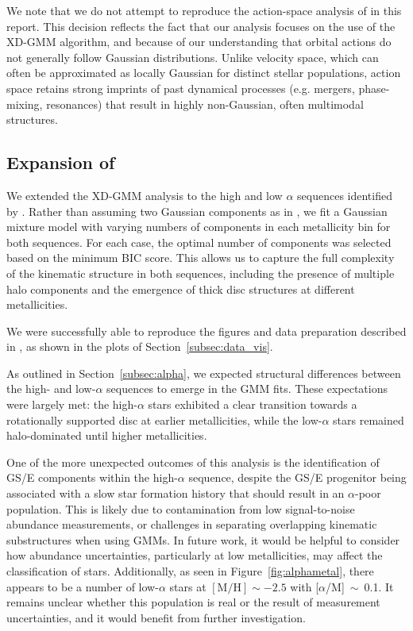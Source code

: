 \documentclass[a4paper,12pt]{article}
\begin{document}
We note that we do not attempt to reproduce the action-space analysis of \citet{zhang2024existencemetalpoordiscmilky} in this report. 
This decision reflects the fact that our analysis focuses on the use of the XD-GMM algorithm, and because of our
understanding that orbital actions do not generally follow Gaussian distributions. Unlike velocity space, which can often be 
approximated as locally Gaussian for distinct stellar populations, action space retains strong imprints 
of past dynamical processes (e.g. mergers, phase-mixing, resonances) that result in highly non-Gaussian, 
often multimodal structures.



\subsection{\texorpdfstring{Expansion of \citet{Vis2024}}{Expansion of Viswanathan et al.\ (2024)}}


We extended the XD-GMM analysis to the high and low $\alpha$ sequences identified by \citet{Vis2024}. 
Rather than assuming two Gaussian components as in \citet{Vis2024}, we fit a
Gaussian mixture model with varying numbers of components in each metallicity bin for both sequences. 
For each case, the optimal number of components was selected based on the minimum BIC score.
This allows us to capture the full complexity of the kinematic structure in both sequences,
including the presence of multiple halo components and the emergence of thick disc structures 
at different metallicities.

We were successfully able to reproduce the figures and data preparation described in \citet{Vis2024}, as shown in the plots of 
Section~\ref{subsec:data_vis}.

As outlined in Section~\ref{subsec:alpha}, we expected structural differences between the high- and low-$\alpha$ sequences 
to emerge in the GMM fits. These expectations were largely met: the high-$\alpha$ stars exhibited a clear transition 
towards a rotationally supported disc at earlier metallicities, while the low-$\alpha$ stars remained halo-dominated 
until higher metallicities.

One of the more unexpected outcomes of this analysis is the identification of GS/E components within the 
high-$\alpha$ sequence, despite the GS/E progenitor being associated with a slow star formation 
history that should result in an $\alpha$-poor population. This is likely due to contamination from 
low signal-to-noise abundance measurements, or challenges in separating overlapping kinematic substructures 
when using GMMs. In future work, it would be helpful to consider how abundance uncertainties, particularly at low 
metallicities, may affect the classification of stars. Additionally, as seen in Figure~\ref{fig:alphametal}, 
there appears to be a number of low-$\alpha$ stars at $[\mathrm{M/H}]\sim-2.5$ with 
[$\alpha$/M]~$\sim$~0.1. It remains unclear whether this population is real or the result of measurement 
uncertainties, and it would benefit from further investigation.
\end{document}
